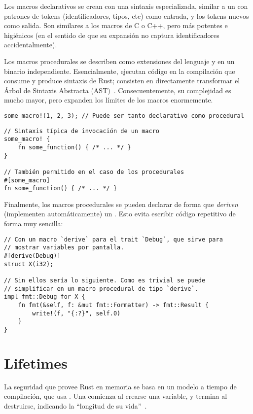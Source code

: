 Los macros declarativos se crean con una sintaxis especializada, similar a un
 con patrones de tokens (identificadores, tipos, etc) como entrada,
y los tokens nuevos como salida. Son similares a los macros de C o C++, pero más
potentes e higiénicos (en el sentido de que su expansión no captura
identificadores accidentalmente).

Los macros procedurales se describen como extensiones del lenguaje y en un
binario independiente. Esencialmente, ejecutan código en la compilación que
consume y produce sintaxis de Rust; consisten en directamente transformar el
Árbol de Sintaxis Abstracta (AST)~\cite[Procedural Macros]{rustref}.
Consecuentemente, su complejidad es mucho mayor, pero expanden los límites de
los macros enormemente.

\begin{verbatim}
some_macro!(1, 2, 3); // Puede ser tanto declarativo como procedural
\end{verbatim}

\begin{verbatim}
// Sintaxis típica de invocación de un macro
some_macro! {
    fn some_function() { /* ... */ }
}

// También permitido en el caso de los procedurales
#[some_macro]
fn some_function() { /* ... */ }
\end{verbatim}

Finalmente, los macros procedurales se pueden declarar de forma que
\emph{deriven} (implementen automáticamente) un \trait. Esto evita escribir
código repetitivo de forma muy sencilla:

\begin{verbatim}
// Con un macro `derive` para el trait `Debug`, que sirve para
// mostrar variables por pantalla.
#[derive(Debug)]
struct X(i32);

// Sin ellos sería lo siguiente. Como es trivial se puede
// simplificar en un macro procedural de tipo `derive`.
impl fmt::Debug for X {
    fn fmt(&self, f: &mut fmt::Formatter) -> fmt::Result {
        write!(f, "{:?}", self.0)
    }
}
\end{verbatim}

\section{Lifetimes}

La seguridad que provee Rust en memoria se basa en un modelo a tiempo de
compilación, que usa \lifetimes. Una \lifetime comienza al crearse una variable,
y termina al destruirse, indicando la ``longitud de su
vida''~\cite[Lifetimes]{rustexample}.


